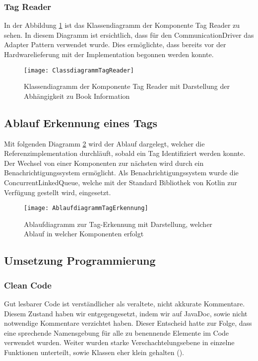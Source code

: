 \subsubsection{Tag Reader}
In der Abbildung \ref{fig:ClassTagReader} ist das Klassendiagramm der Komponente Tag Reader zu sehen.
In diesem Diagramm ist ersichtlich, dass für den CommunicationDriver das Adapter Pattern verwendet wurde. Dies ermöglichte, dass bereits vor der Hardwarelieferung mit der Implementation begonnen werden konnte. 

\begin{figure}[htb]
	\centering
	\texttt{[image: ClassdiagrammTagReader]}
	\caption{Klassendiagramm der Komponente Tag Reader mit Darstellung der Abhängigkeit zu Book Information}
	\label{fig:ClassTagReader}
\end{figure}


\subsection{Ablauf Erkennung eines Tags}
Mit folgenden Diagramm \ref{fig:AblaufdiagrammTagErkennung} wird der Ablauf dargelegt, welcher die Referenzimplementation durchläuft, sobald ein Tag Identifiziert werden konnte. Der Wechsel von einer Komponenten zur nächsten wird durch ein Benachrichtigungssystem ermöglicht. Als Benachrichtigungssystem wurde die ConcurrentLinkedQueue, welche mit der Standard Bibliothek von Kotlin zur Verfügung gestellt wird, eingesetzt. 
\begin{figure}[htb]
	\centering
	\texttt{[image: AblaufdiagrammTagErkennung]}
	\caption{Ablaufdiagramm zur Tag-Erkennung mit Darstellung, welcher Ablauf in welcher Komponenten erfolgt}
	\label{fig:AblaufdiagrammTagErkennung}
\end{figure}

\clearpage
\subsection{Umsetzung Programmierung}
\subsubsection{Clean Code}
Gut lesbarer Code ist verständlicher als veraltete, nicht akkurate Kommentare. Diesem Zustand haben wir entgegengesetzt, indem wir auf JavaDoc, sowie nicht notwendige Kommentare verzichtet haben. Dieser Entscheid hatte zur Folge, dass eine sprechende Namensgebung für alle zu benennende Elemente im Code verwendet wurden. Weiter wurden starke Verschachtelungsebene in einzelne Funktionen unterteilt, sowie Klassen eher klein gehalten (\cite{martin2009clean}).

